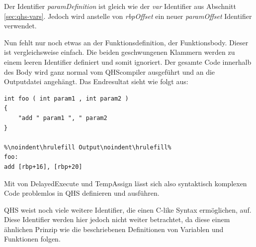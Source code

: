 Der Identifier \textit{paramDefinition} ist gleich wie der \textit{var} Identifier aus Abschnitt \ref{sec:qhs-vars}. Jedoch wird anstelle von \textit{rbpOffset} ein neuer \textit{paramOffset} Identifier verwendet.

Nun fehlt nur noch etwas an der Funktionsdefinition, der Funktionsbody. Dieser ist vergleichsweise einfach. Die beiden geschwungenen Klammern werden zu einem leeren Identifier definiert und somit ignoriert.
Der gesamte Code innerhalb des Body wird ganz normal vom QHScompiler ausgeführt und an die Outputdatei angehängt. Das Endresultat sieht wie folgt aus:

\begin{lstlisting}[language=QHS, caption=Finale Definition einer Funktion in QHS]
int foo ( int param1 , int param2 )
{
    "add " param1 ", " param2
}

%\noindent\hrulefill Output\noindent\hrulefill%
foo:
add [rbp+16], [rbp+20]
\end{lstlisting}

Mit von DelayedExecute und TempAssign lässt sich also syntaktisch komplexen Code problemlos in QHS definieren und ausführen.

QHS weist noch viele weitere Identifier, die einen C-like Syntax ermöglichen, auf.
Diese Identifier werden hier jedoch nicht weiter betrachtet, da diese einem ähnlichen Prinzip wie die beschriebenen Definitionen von Variablen und Funktionen folgen. 


    






